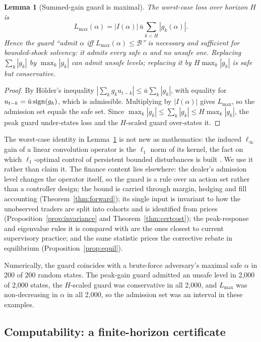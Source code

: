 \documentclass[12pt]{article}
\newtheorem{lemma}[theorem]{Lemma}
\theoremstyle{definition}
\theoremstyle{remark}
\begin{document}
\begin{lemma}[Summed-gain guard is maximal]\label{thm:guard}
The worst-case loss over horizon $H$ is
\[
L_{\max}(\alpha)=|I(\alpha)|\,\bar u\sum_{k<H}|g_k(\alpha)|.
\]
Hence the guard ``admit $\alpha$ iff $L_{\max}(\alpha)\le\mathcal B$'' is necessary and sufficient for bounded-shock solvency: it admits every safe $\alpha$ and no unsafe one. Replacing $\sum_k|g_k|$ by $\max_k|g_k|$ can admit unsafe levels; replacing it by $H\max_k|g_k|$ is safe but conservative.
\end{lemma}

\begin{proof}
By H\"older's inequality $|\sum_kg_ku_{t-k}|\le\bar u\sum_k|g_k|$, with equality for $u_{t-k}=\bar u\,{\rm sign}(g_k)$, which is admissible. Multiplying by $|I(\alpha)|$ gives $L_{\max}$, so the admission set equals the safe set. Since $\max_k|g_k|\le\sum_k|g_k|\le H\max_k|g_k|$, the peak guard under-states loss and the $H$-scaled guard over-states it.
\end{proof}

The worst-case identity in Lemma~\ref{thm:guard} is not new as mathematics: the induced $\ell_\infty$ gain of a linear convolution operator is the $\ell_1$ norm of its kernel, the fact on which $\ell_1$-optimal control of persistent bounded disturbances is built \citep{vidyasagar1986,dahleh1987,dahleh1995}. We use it rather than claim it. The finance content lies elsewhere: the dealer's admission level changes the operator itself, so the guard is a rule over an action set rather than a controller design; the bound is carried through margin, hedging and fill accounting (Theorem~\ref{thm:forward}); its single input is invariant to how the unobserved traders are split into cohorts and is identified from prices (Proposition~\ref{prop:invariance} and Theorem~\ref{thm:certcost}); the peak-response and eigenvalue rules it is compared with are the ones closest to current supervisory practice; and the same statistic prices the corrective rebate in equilibrium (Proposition~\ref{prop:equil}).

Numerically, the guard coincides with a brute-force adversary's maximal safe $\alpha$ in 200 of 200 random states. The peak-gain guard admitted an unsafe level in 2,000 of 2,000 states, the $H$-scaled guard was conservative in all 2,000, and $L_{\max}$ was non-decreasing in $\alpha$ in all 2,000, so the admission set was an interval in these examples.

\subsection{Computability: a finite-horizon certificate}
\end{document}
